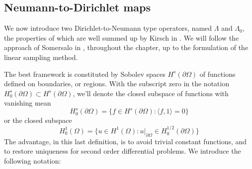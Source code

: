 \documentclass[10pt, a4paper, twoside, openright]{book}
\theoremstyle{definition}
\theoremstyle{plain}
\theoremstyle{plain}
\theoremstyle{plain}
\theoremstyle{plain}
\theoremstyle{plain}
\theoremstyle{plain}
\theoremstyle{plain}
\theoremstyle{plain}
\begin{document}
\subsection{Neumann-to-Dirichlet maps}
We now introduce two Dirichlet-to-Neumann type operators, named $\Lambda$ and $\Lambda_0$, the properties of which are well summed up by Kirsch in \cite{kirsch:book}. 
We will follow the approach of Somersalo in \cite{somersalo:preprint}, throughout the chapter, up to the formulation of the linear sampling method.
\par
The best framework is constituted by Sobolev spaces $H^s(\partial \Omega)$ of functions defined on boundaries, or regions.
With the subscript zero in the notation $H^s_0(\partial\Omega)\subset H^s(\partial\Omega)$, we'll denote the closed subspace of functions with vanishing mean
\begin{equation}
H^s_0(\partial\Omega) = \Big\{ f \in H^s(\partial\Omega): \langle f,1\rangle = 0\Big\}
\end{equation}
or the closed subspace
\begin{equation}
H^1_0(\Omega) = \Big\{ u \in H^1(\Omega): u|_{\partial\Omega} \in H^{1/2}_0(\partial\Omega)\Big\}
\end{equation}
The advantage, in this last definition, is to avoid trivial constant functions, and to restore uniqueness for second order differential problems.
We introduce the following notation:
\end{document}
